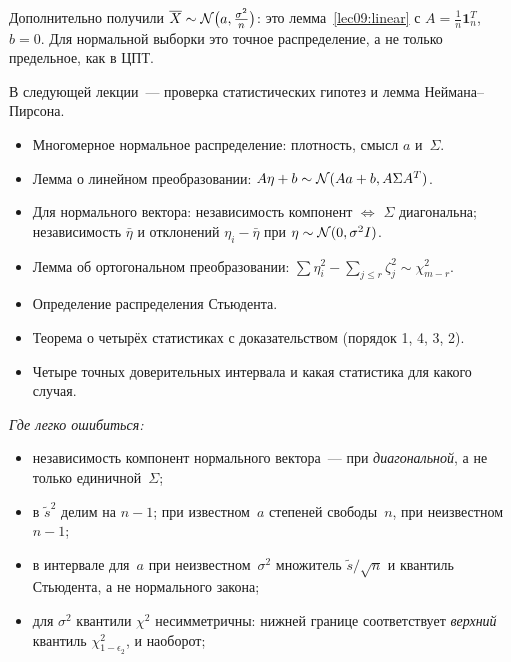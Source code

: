 \begin{remark}
  Дополнительно получили $\overline{X} \sim \mathcal{N}\bigl(a, \frac{\sigma^2}{n}\bigr)$: это лемма~\ref{lec09:linear}
  с $A = \frac1n \mathbf{1}_n^T$, $b = 0$. Для нормальной выборки это точное распределение,
  а не только предельное, как в ЦПТ.
\end{remark}

В следующей лекции~--- проверка статистических гипотез и лемма Неймана--Пирсона.

\begin{keybox}
  \begin{itemize}
    \item Многомерное нормальное распределение: плотность, смысл $a$ и~$\Sigma$.
    \item Лемма о линейном преобразовании: $A\eta + b \sim \mathcal{N}(Aa + b, A\Sigma A^T)$.
    \item Для нормального вектора: независимость компонент $\iff$ $\Sigma$ диагональна;
          независимость $\bar\eta$ и отклонений $\eta_i - \bar\eta$ при $\eta \sim \mathcal{N}(0, \sigma^2 I)$.
    \item Лемма об ортогональном преобразовании: $\sum \eta_i^2 - \sum_{j \le r} \zeta_j^2 \sim \chi^2_{m-r}$.
    \item Определение распределения Стьюдента.
    \item Теорема о четырёх статистиках с доказательством (порядок 1, 4, 3, 2).
    \item Четыре точных доверительных интервала и какая статистика для какого случая.
  \end{itemize}
  \emph{Где легко ошибиться:}
  \begin{itemize}
    \item независимость компонент нормального вектора~--- при \emph{диагональной}, а не только
          единичной~$\Sigma$;
    \item в $\tilde s^2$ делим на $n - 1$; при известном~$a$ степеней свободы~$n$, при
          неизвестном~$n - 1$;
    \item в интервале для~$a$ при неизвестном~$\sigma^2$ множитель $\tilde s / \sqrt n$ и квантиль
          Стьюдента, а не нормального закона;
    \item для $\sigma^2$ квантили $\chi^2$ несимметричны: нижней границе соответствует
          \emph{верхний} квантиль $\chi^2_{1-\epsilon_2}$, и наоборот;
  \end{itemize}
\end{keybox}
